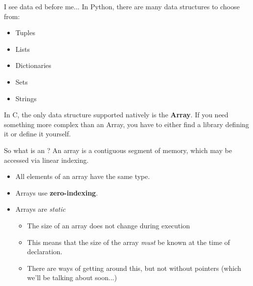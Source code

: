 \documentclass[11pt]{beamer}
\let\OldTexttt\texttt
\renewcommand{\texttt}[1]{\OldTexttt{\color{teal}{#1}}}
\begin{document}
\begin{frame}{I see data \texttt{Array}ed before me...}
In Python, there are many data structures to choose from:
\begin{itemize}
\item Tuples
\item Lists
\item Dictionaries
\item Sets
\item Strings
\end{itemize}
In C, the only data structure supported natively is the \textbf{Array}.  If you need something more complex than an Array, you have to either find a library defining it or define it yourself. 
\end{frame}

\begin{frame}{So what is an \texttt{Array}?}
An array is a contiguous segment of memory, which may be accessed via linear indexing.
\begin{itemize}
\item All elements of an array have the same type.
\item Arrays use \textbf{zero-indexing}.
\item Arrays are \emph{static}
\begin{itemize}
\item The size of an array does not change during execution
\item This means that the size of the array \emph{must} be known at the time of declaration.  
\item There are ways of getting around this, but not without pointers (which we'll be talking about soon...)
\end{itemize}
\end{itemize}
\end{frame}
\end{document}

